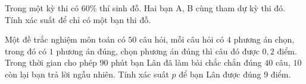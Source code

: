\begin{bt}%
	Trong một kỳ thi có $60$\% thí sinh đỗ. Hai bạn A, B cùng tham dự kỳ thi đó. Tính xác suất để chỉ có một bạn thi đỗ.
\end{bt}

\begin{bt}%
	Một đề trắc nghiệm môn toán có $50$ câu hỏi, mỗi câu hỏi có $4$ phương án chọn, trong đó có $1$ phương án đúng, chọn phương án đúng thì câu đó được $0{,2}$ điểm. Trong thời gian cho phép $90$ phút bạn Lân đã làm bài chắc chắn đúng $40$ câu, $10$ còn lại bạn trả lời ngẫu nhiên. Tính xác suất $p$ để bạn Lân được đúng $9$ điểm.
\end{bt}

